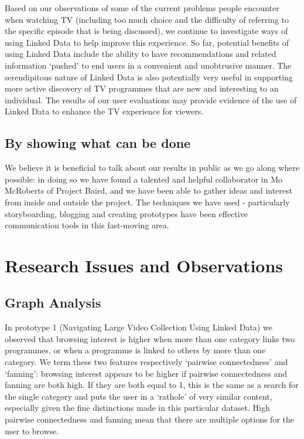 \documentclass{notube}
\begin{document}
Based on our observations of some of the current problems people encounter when watching TV (including too much choice and the difficulty of referring to the specific episode that is being discussed), we continue to investigate ways of using Linked Data to help improve this experience. So far, potential benefits of using Linked Data include the ability to have recommendations and related information `pushed' to end users in a convenient and unobtrusive manner. The serendipitous nature of Linked Data is also potentially very useful in supporting more active discovery of TV programmes that are new and interesting to an individual. The results of our user evaluations may provide evidence of the use of Linked Data to enhance the TV experience for viewers. 

\section{By showing what can be done}

We believe it is beneficial to talk about our results in public as we go along where possible: in doing so we have found a talented and helpful collaborator in Mo McRoberts of Project Baird, and we have been able to gather ideas and interest from inside and outside the project. The techniques we have used - particularly storyboarding, blogging and creating prototypes have been effective communication tools in this fast-moving area.


\chapter{Research Issues and Observations}



\section{Graph Analysis}

In prototype 1 (Navigating Large Video Collection Using Linked Data) we observed that browsing interest is higher when more than one category links two programmes, or when a programme is linked to others by more than one category. We term these two features respectively `pairwise connectedness' and `fanning': browsing interest appears to be higher if pairwise connectedness and fanning are both high. If they are both equal to 1, this is the same as a search for the single category and puts the user in a `rathole' of very similar content, especially given the fine distinctions made in this particular dataset. High pairwise connectedness and fanning mean that there are multiple options for the user to browse.
\end{document}
